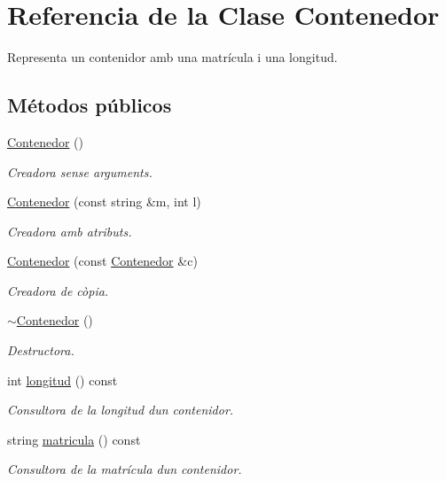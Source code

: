 \hypertarget{class_contenedor}{}\section{Referencia de la Clase Contenedor}
\label{class_contenedor}


Representa un contenidor amb una matrícula i una longitud.  


\subsection*{Métodos públicos}
\begin{DoxyCompactItemize}
\item 
\hyperlink{class_contenedor_a1edc43fbcead41c4eba6530b7099cefd}{Contenedor} ()
\begin{DoxyCompactList}\small\item\em Creadora sense arguments. \end{DoxyCompactList}\item 
\hyperlink{class_contenedor_a84c6c247b6e5939fdd160160b1d1f449}{Contenedor} (const string \&m, int l)
\begin{DoxyCompactList}\small\item\em Creadora amb atributs. \end{DoxyCompactList}\item 
\hyperlink{class_contenedor_ada07edb2a23eec1f84b87b4b3de2c909}{Contenedor} (const \hyperlink{class_contenedor}{Contenedor} \&c)
\begin{DoxyCompactList}\small\item\em Creadora de còpia. \end{DoxyCompactList}\item 
\hyperlink{class_contenedor_a3648194b1174752cb24967d1c53787af}{$\sim$\+Contenedor} ()
\begin{DoxyCompactList}\small\item\em Destructora. \end{DoxyCompactList}\item 
int \hyperlink{class_contenedor_a203894805dd0b8347f9884990dab0d9d}{longitud} () const
\begin{DoxyCompactList}\small\item\em Consultora de la longitud d\textquotesingle{}un contenidor. \end{DoxyCompactList}\item 
string \hyperlink{class_contenedor_aac5839c94f8d3be8a908740a1af0b716}{matricula} () const
\begin{DoxyCompactList}\small\item\em Consultora de la matrícula d\textquotesingle{}un contenidor. \end{DoxyCompactList}\item 

\end{DoxyCompactItemize}
